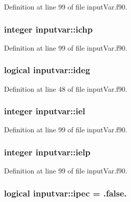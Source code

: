 Definition at line 99 of file input\-Var.\-f90.

\hypertarget{classinputvar_af57151a30c510558682b98e1b72d844b}{
\subsubsection[{ichp}]{\setlength{\rightskip}{0pt plus 5cm}integer inputvar\-::ichp}}\label{classinputvar_af57151a30c510558682b98e1b72d844b}


Definition at line 99 of file input\-Var.\-f90.

\hypertarget{classinputvar_a62235e6c8b16a98c1aea10ac01e11ac9}{
\subsubsection[{ideg}]{\setlength{\rightskip}{0pt plus 5cm}logical inputvar\-::ideg}}\label{classinputvar_a62235e6c8b16a98c1aea10ac01e11ac9}


Definition at line 48 of file input\-Var.\-f90.

\hypertarget{classinputvar_a6f9a3a8beea8f6e1aa8140bab654a48f}{
\subsubsection[{iel}]{\setlength{\rightskip}{0pt plus 5cm}integer inputvar\-::iel}}\label{classinputvar_a6f9a3a8beea8f6e1aa8140bab654a48f}


Definition at line 99 of file input\-Var.\-f90.

\hypertarget{classinputvar_a0190bc42c3dad91d811c585952ff55f4}{
\subsubsection[{ielp}]{\setlength{\rightskip}{0pt plus 5cm}integer inputvar\-::ielp}}\label{classinputvar_a0190bc42c3dad91d811c585952ff55f4}


Definition at line 99 of file input\-Var.\-f90.

\hypertarget{classinputvar_af90e08308cf6a7de1480cfde429187d3}{
\subsubsection[{ipec}]{\setlength{\rightskip}{0pt plus 5cm}logical inputvar\-::ipec = .false.}}\label{classinputvar_af90e08308cf6a7de1480cfde429187d3}


